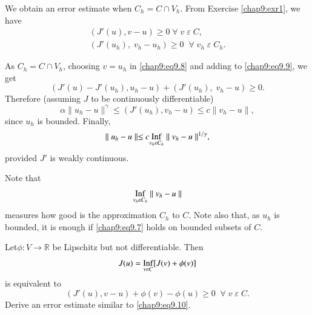\begin{case}\label{chap9:case1}
We obtain an error estimate when $C_h=C\cap V_h$. From Exercise
\ref{chap9:exr1}, we have 
\begin{align}
(J'(u),v-u)\geq 0\;\forall \;v\;\varepsilon \;C, \label{chap9:eq9.8}\\
(J'(u_h),\;v_h-u_h)\geq 0\; \; \forall \;v_h\;\varepsilon
\;C_h. \label{chap9:eq9.9} 
\end{align}

As $C_h=C\cap V_h$, choosing $v=u_h$ in \eqref{chap9:eq9.8} and adding
to \eqref{chap9:eq9.9}, we get 
$$
(J'(u)-J'(u_h),u_h-u)+(J'(u_h),\;v_h-u)\geq 0.
$$
Therefore (assuming $J$ to be continuously differentiable)
$$
\alpha\parallel u_h-u\parallel^\gamma\leq(J'(u_h),v_h-u)\leq
c\parallel v_h-u\parallel,
$$
since $u_h$ is bounded. Finally,
\begin{equation}\label{chap9:eq9.10}
\parallel u_h-u\parallel\leq c\underset{v_h\varepsilon C_h}{\operatorname{Inf}}
\parallel v_h-u\parallel^{1/\gamma},
\end{equation}
provided $J'$ is weakly continuous.

Note that 
$$
\underset{v_h\varepsilon C_h}{\operatorname{Inf}}\parallel v_h-u\parallel
$$
measures how good is the approximation $C_h$ to $C$. Note also that,
as $u_h$ is bounded, it is enough if \eqref{chap9:eq9.7} holds on
bounded subsets of $C$. 
\end{case}

\begin{exercise}\label{chap9:exr2}
Let\pageoriginale $\phi:V\to\mathbb{R}$ be Lipschitz but not
differentiable. Then 
$$
J(u)=\underset{v\varepsilon C}{\operatorname{Inf}}[J(v)+\phi(v)]
$$
is equivalent to 
$$
(J'(u),v-u)+\phi(v)-\phi(u)\geq 0\; \; \forall \;v\;\varepsilon \;C.
$$
Derive an error estimate similar to \eqref{chap9:eq9.10}.
\end{exercise}

